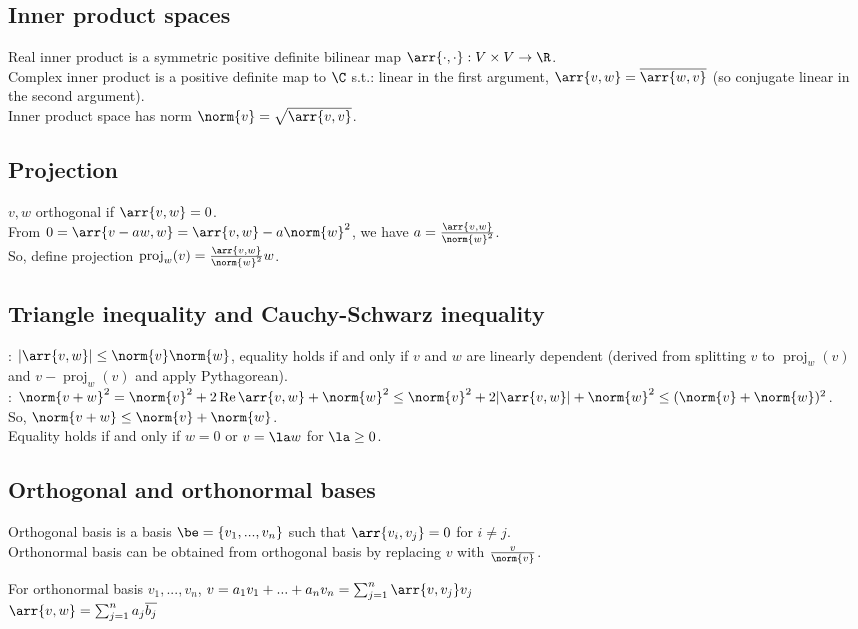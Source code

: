 \documentclass[10pt]{LatexTemplate/hw}
\begin{document}
\begin{multicols*}{2}
\section{Inner product spaces}
Real inner product is a symmetric positive definite bilinear map $\arr{\cdot,\cdot}:V\times V\to\R$.\\
Complex inner product is a positive definite map to $\C$ s.t.: linear in the first argument, $\arr{v,w}=\overline{\arr{w,v}}$ (so conjugate linear in the second argument).\\
Inner product space has norm $\norm{v}=\sqrt{\arr{v,v}}$.
\subsection{Projection}
$v,w$ orthogonal if $\arr{v,w}=0$.\\
From $0=\arr{v-aw,w}=\arr{v,w}-a\norm{w}^2$, we have $a=\frac{\arr{v,w}}{\norm{w}^2}$.\\
So, define projection $\operatorname{proj}_w(v)=\frac{\arr{v,w}}{\norm{w}^2}w$.
\subsection{Triangle inequality and Cauchy-Schwarz inequality}
: $|\arr{v,w}|\le \norm{v}\norm{w}$, equality holds if and only if $v$ and $w$ are linearly dependent (derived from splitting $v$ to $\operatorname{proj}_w(v)$ and $v-\operatorname{proj}_w(v)$ and apply Pythagorean).\\
: $\norm{v+w}^2=\norm{v}^2+2\operatorname{Re}\arr{v,w}+\norm{w}^2\le\norm{v}^2+2|\arr{v,w}|+\norm{w}^2\le(\norm{v}+\norm{w})^2$.\\
So, $\norm{v+w}\le\norm{v}+\norm{w}$.\\
Equality holds if and only if $w=0$ or $v=\la w$ for $\la\ge0$.
\subsection{Orthogonal and orthonormal bases}
Orthogonal basis is a basis $\be=\{v_1,...,v_n\}$ such that $\arr{v_i,v_j}=0$ for $i\ne j$.\\
Orthonormal basis can be obtained from orthogonal basis by replacing $v$ with $\frac{v}{\norm{v}}$.

For orthonormal basis $v_1,...,v_n$, $v=a_1v_1+...+a_nv_n=\sum_{j=1}^n\arr{v,v_j}v_j$\\
$\arr{v,w}=\sum_{j=1}^n a_j\overline{b_j}$

\end{multicols*}
\end{document}
